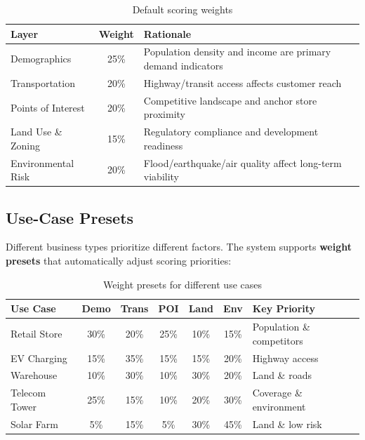 \documentclass[12pt, a4paper]{article}
\begin{document}
\begin{table}[H]
\centering
\begin{tabularx}{\textwidth}{l c X}
    \toprule
    \textbf{Layer} & \textbf{Weight} & \textbf{Rationale} \\
    \midrule
    Demographics      & 25\% & Population density and income are primary demand indicators \\
    Transportation    & 20\% & Highway/transit access affects customer reach \\
    Points of Interest & 20\% & Competitive landscape and anchor store proximity \\
    Land Use \& Zoning & 15\% & Regulatory compliance and development readiness \\
    Environmental Risk & 20\% & Flood/earthquake/air quality affect long-term viability \\
    \bottomrule
\end{tabularx}
\caption{Default scoring weights}
\end{table}

\subsection{Use-Case Presets}

Different business types prioritize different factors. The system supports
\textbf{weight presets} that automatically adjust scoring priorities:

\begin{table}[H]
\centering
\small
\begin{tabular}{l c c c c c l}
    \toprule
    \textbf{Use Case} & \textbf{Demo} & \textbf{Trans} & \textbf{POI} & \textbf{Land} & \textbf{Env} & \textbf{Key Priority} \\
    \midrule
    Retail Store  & 30\% & 20\% & 25\% & 10\% & 15\% & Population \& competitors \\
    EV Charging   & 15\% & 35\% & 15\% & 15\% & 20\% & Highway access \\
    Warehouse     & 10\% & 30\% & 10\% & 30\% & 20\% & Land \& roads \\
    Telecom Tower & 25\% & 15\% & 10\% & 20\% & 30\% & Coverage \& environment \\
    Solar Farm    & 5\%  & 15\% & 5\%  & 30\% & 45\% & Land \& low risk \\
    \bottomrule
\end{tabular}
\caption{Weight presets for different use cases}
\end{table}
\end{document}
